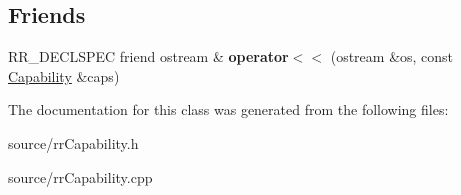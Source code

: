 \subsection*{Friends}
\begin{DoxyCompactItemize}
\item 
\hypertarget{classrr_1_1_capability_a1ea365adf3292827f9f9a736f7b3abea}{R\-R\-\_\-\-D\-E\-C\-L\-S\-P\-E\-C friend ostream \& {\bfseries operator$<$$<$} (ostream \&os, const \hyperlink{classrr_1_1_capability}{Capability} \&caps)}\label{classrr_1_1_capability_a1ea365adf3292827f9f9a736f7b3abea}

\end{DoxyCompactItemize}


The documentation for this class was generated from the following files\-:\begin{DoxyCompactItemize}
\item 
source/rr\-Capability.\-h\item 
source/rr\-Capability.\-cpp\end{DoxyCompactItemize}
